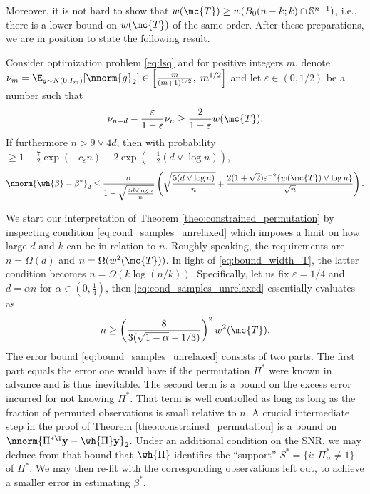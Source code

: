 \documentclass[11pt]{article}
\def\y{\mathbf{y}}
\def\epss{\varepsilon}
\begin{document}
Moreover, it is not hard to show that $w(\mc{T}) \geq w(B_0(n-k;k) \cap \mathbb{S}^{n-1})$, i.e., there is 
a lower bound on $w(\mc{T})$ of the same order. After these preparations, we are in position to state the following result. 
\begin{theo}\label{theo:constrained_permutation} Consider optimization problem \eqref{eq:lsq} and for positive integers $m$, 
denote $\nu_m = \E_{g \sim N(0, I_m)}[\nnorm{g}_2] \in \left[\frac{m}{(m+1)^{1/2}}, \; m^{1/2} \right]$ and let $\varepsilon \in (0,1/2)$ be a number such that 
\begin{equation}\label{eq:cond_samples_unrelaxed}
\nu_{n-d} - \frac{\epss}{1-\varepsilon}\nu_n \geq \frac{2}{1 - \varepsilon} w(\mc{T}). 
\end{equation}
If furthermore $n > 9 \vee 4d$, then with probability $\geq 1 - \frac{7}{2}\exp(-c_{\epss} n) - 2 \exp \left(-\frac{1}{2} (d \vee \log n) \right)$,  
\begin{equation}\label{eq:bound_samples_unrelaxed}
\nnorm{\wh{\beta} - \beta^*}_2 \leq   \frac{\sigma}{1 - \sqrt{\frac{4 d \vee \log n}{n}}} \left(\sqrt{\frac{5 (d \vee \log n)}{n}} + \frac{2 (1 + \sqrt{2}) \epss^{-2} \{w(\mc{T}) \vee \log n\}}{\sqrt{n}} \right).
\end{equation}  
\end{theo}
\noindent We start our interpretation of Theorem \ref{theo:constrained_permutation} by inspecting condition \eqref{eq:cond_samples_unrelaxed} which imposes a limit on how large $d$ and $k$ can be in relation to $n$. Roughly speaking, the requirements are $n = \Omega(d)$ and $n = \Omega(w^2(\mc{T}))$. In light of \eqref{eq:bound_width_T}, the latter condition becomes $n = \Omega(k \log(n/k))$. Specifically, let us fix $\epss = 1/4$ and $d = \alpha n$ for $\alpha \in (0,\frac{1}{4})$, then \eqref{eq:cond_samples_unrelaxed} essentially evaluates as
\begin{equation*}
n \geq \left(\frac{8}{3 (\sqrt{1 -\alpha} - 1/3)}\right)^2 w^2(\mc{T}). 
\end{equation*}
The error bound \eqref{eq:bound_samples_unrelaxed} consists of two parts. The first part equals the error one would have if the permutation $\Pi^*$ were known in advance and is thus inevitable. The second term is a bound on the excess error incurred for not knowing $\Pi^*$. That term is well controlled as long as long as the fraction of permuted observations is small relative to $n$. A crucial intermediate step in the proof of Theorem \ref{theo:constrained_permutation} is
a bound on $\nnorm{\Pi^{*\T} \y - \wh{\Pi} \y}_2$. Under an additional condition on the SNR, we may deduce from that bound that $\wh{\Pi}$ identifies the ``support''  $S^* = \{i: \, \Pi_{ii}^* \neq 1\}$ of $\Pi^*$. We may then re-fit with the corresponding observations left out, to achieve a smaller error in estimating $\beta^*$.
\end{document}
